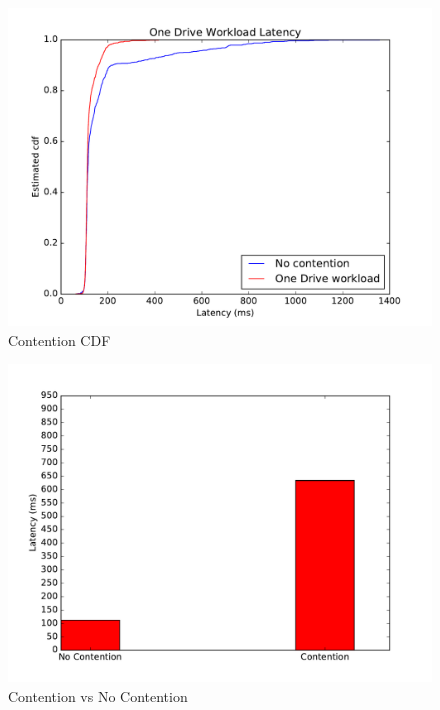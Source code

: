 \begin{figure}[t]
      \includegraphics[width=\linewidth]{images/Contention_cdf}
      \caption{Contention CDF}
      \label{fig:gizacontentioncdf}
\end{figure}

\begin{figure}[t]
      \includegraphics[width=\linewidth]{images/Contention_bar}
      \caption{Contention vs No Contention}
      \label{fig:gizacontentionbar}
\end{figure}

